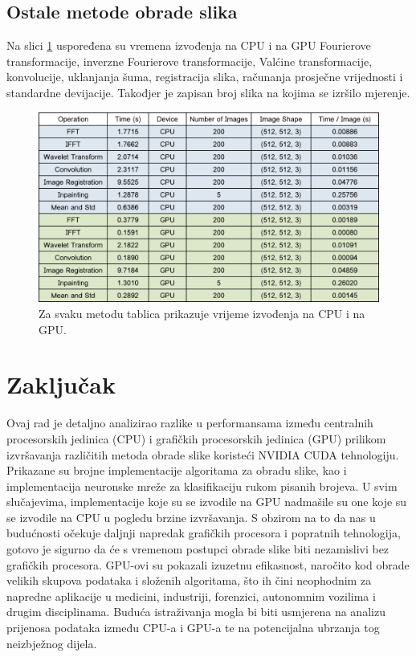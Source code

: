 \documentclass[a4paper,twocolumn]{article}
\begin{document}
        \subsection{Ostale metode obrade slika}
        
        Na slici \ref{fig:ostale_metode} uspoređena su vremena izvođenja na CPU i na GPU Fourierove transformacije, inverzne Fourierove transformacije, Valćine transformacije, konvolucije, uklanjanja šuma, registracija slika, računanja prosječne vrijednosti i standardne devijacije. Takođjer je zapisan broj slika na kojima se izršilo mjerenje.
        
		\begin{figure}[H]
			\centering
			\includegraphics[width=1.05\linewidth]{slike/times_other.png} 
			\caption{Za svaku metodu tablica prikazuje vrijeme izvođenja na CPU i na GPU.}
			\label{fig:ostale_metode}
		\end{figure} 
				
	\section{Zaključak}
	Ovaj rad je detaljno analizirao razlike u performansama između centralnih procesorskih jedinica (CPU) i grafičkih procesorskih jedinica (GPU) prilikom izvršavanja različitih metoda obrade slike koristeći NVIDIA CUDA tehnologiju. Prikazane su brojne implementacije algoritama za obradu slike, kao i implementacija neuronske mreže za klasifikaciju rukom pisanih brojeva. U svim slučajevima, implementacije koje su se izvodile na GPU nadmašile su one koje su se izvodile na CPU u pogledu brzine izvršavanja. \newline
	S obzirom na to da nas u budućnosti očekuje daljnji napredak grafičkih procesora i popratnih tehnologija, gotovo je sigurno da će s vremenom postupci obrade slike biti nezamislivi bez grafičkih procesora. GPU-ovi su pokazali izuzetnu efikasnost, naročito kod obrade velikih skupova podataka i složenih algoritama, što ih čini neophodnim za napredne aplikacije u medicini, industriji, forenzici, autonomnim vozilima i drugim disciplinama. \newline
	Buduća istraživanja mogla bi biti usmjerena na analizu prijenosa podataka između CPU-a i GPU-a te na potencijalna ubrzanja tog neizbježnog dijela.
	
	
	

        

 
	
\end{document}
